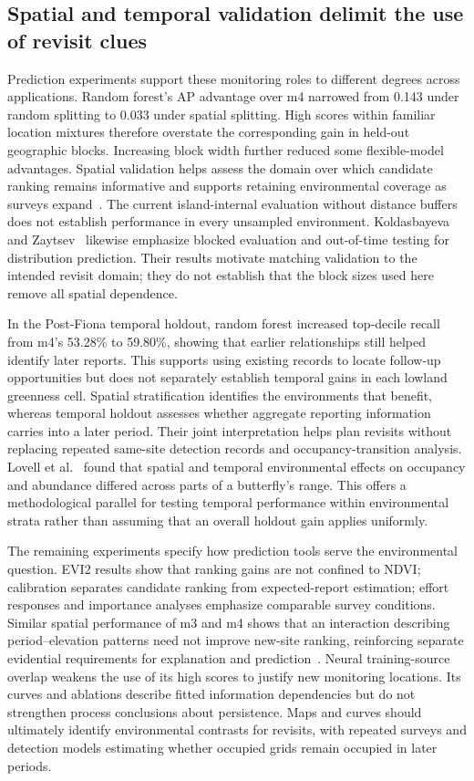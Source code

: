 \subsection{Spatial and temporal validation delimit the use of revisit clues}
Prediction experiments support these monitoring roles to different degrees across applications. Random forest's AP advantage over m4 narrowed from 0.143 under random splitting to 0.033 under spatial splitting. High scores within familiar location mixtures therefore overstate the corresponding gain in held-out geographic blocks. Increasing block width further reduced some flexible-model advantages. Spatial validation helps assess the domain over which candidate ranking remains informative and supports retaining environmental coverage as surveys expand~\cite{roberts2017,valavi2019,ploton2020}. The current island-internal evaluation without distance buffers does not establish performance in every unsampled environment. Koldasbayeva and Zaytsev~\cite{spacetime2025} likewise emphasize blocked evaluation and out-of-time testing for distribution prediction. Their results motivate matching validation to the intended revisit domain; they do not establish that the block sizes used here remove all spatial dependence.

In the Post-Fiona temporal holdout, random forest increased top-decile recall from m4's 53.28\% to 59.80\%, showing that earlier relationships still helped identify later reports. This supports using existing records to locate follow-up opportunities but does not separately establish temporal gains in each lowland greenness cell. Spatial stratification identifies the environments that benefit, whereas temporal holdout assesses whether aggregate reporting information carries into a later period. Their joint interpretation helps plan revisits without replacing repeated same-site detection records and occupancy-transition analysis. Lovell et al.~\cite{lovell2025} found that spatial and temporal environmental effects on occupancy and abundance differed across parts of a butterfly's range. This offers a methodological parallel for testing temporal performance within environmental strata rather than assuming that an overall holdout gain applies uniformly.

The remaining experiments specify how prediction tools serve the environmental question. EVI2 results show that ranking gains are not confined to NDVI; calibration separates candidate ranking from expected-report estimation; effort responses and importance analyses emphasize comparable survey conditions. Similar spatial performance of m3 and m4 shows that an interaction describing period--elevation patterns need not improve new-site ranking, reinforcing separate evidential requirements for explanation and prediction~\cite{elith2009}. Neural training-source overlap weakens the use of its high scores to justify new monitoring locations. Its curves and ablations describe fitted information dependencies but do not strengthen process conclusions about persistence. Maps and curves should ultimately identify environmental contrasts for revisits, with repeated surveys and detection models estimating whether occupied grids remain occupied in later periods.

